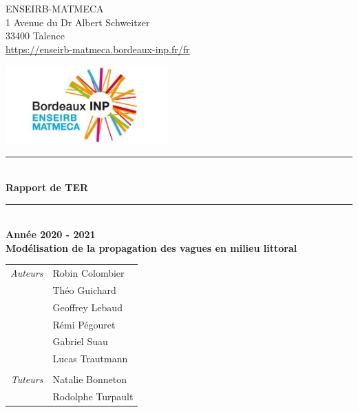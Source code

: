 \documentclass[
a4paper,
11pt,
titlepage,
]{article}
\begin{document}
\thispagestyle{empty}
\begin{titlepage}
	
  \begin{multicols}{2}
    \noindent ENSEIRB-MATMECA\\
    1 Avenue du Dr Albert Schweitzer\\
    33400 Talence\\
    \url{https://enseirb-matmeca.bordeaux-inp.fr/fr}
    \begin{flushright}
      \includegraphics[height=3cm]{logo_enseirb_matmeca.png}
    \end{flushright}
  \end{multicols}
  
  \begin{center}
    \rule{\linewidth}{0.5mm}\\[0.5cm]
    {\Large \textbf{Rapport de TER}}\\[0.3cm]
    \rule{\linewidth}{0.5mm}\\[1.5cm]
    
    \textbf{Année 2020 - 2021}\\[1.5cm]	
    
    \textbf{Modélisation de la propagation des vagues en milieu littoral}\\[3cm]
    
    \begin{tabular}{rl}
      {\it Auteurs} & Robin {\sc Colombier}\\
      				& Théo {\sc Guichard}\\
      				& Geoffrey {\sc Lebaud}\\
      				& Rémi {\sc Pégouret}\\
      				& Gabriel {\sc Suau}\\
      				& Lucas {\sc Trautmann}\\
      				&\\
      	{\it Tuteurs} & Natalie {\sc Bonneton}\\
      				& Rodolphe {\sc Turpault}\\
    \end{tabular}\\[2cm]
  \end{center}
\end{titlepage}
\end{document}
